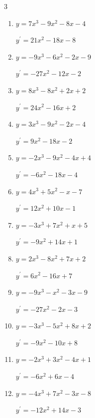 \begin{multicols}{3}
\begin{enumerate}
        $\displaystyle y^{\prime}=18x^{2}+6x+8$

  \item $y=7x^{3}-9x^{2}-8x-4$

        $\displaystyle y^{\prime}=21x^{2}-18x-8$

  \item $y=-9x^{3}-6x^{2}-2x-9$

        $\displaystyle y^{\prime}=-27x^{2}-12x-2$

  \item $y=8x^{3}-8x^{2}+2x+2$

        $\displaystyle y^{\prime}=24x^{2}-16x+2$

  \item $y=3x^{3}-9x^{2}-2x-4$

        $\displaystyle y^{\prime}=9x^{2}-18x-2$

  \item $y=-2x^{3}-9x^{2}-4x+4$

        $\displaystyle y^{\prime}=-6x^{2}-18x-4$

\columnbreak %

\resetques

  \item $y=4x^{3}+5x^{2}-x-7$

        $\displaystyle y^{\prime}=12x^{2}+10x-1$

  \item $y=-3x^{3}+7x^{2}+x+5$

        $\displaystyle y^{\prime}=-9x^{2}+14x+1$

  \item $y=2x^{3}-8x^{2}+7x+2$

        $\displaystyle y^{\prime}=6x^{2}-16x+7$

  \item $y=-9x^{3}-x^{2}-3x-9$

        $\displaystyle y^{\prime}=-27x^{2}-2x-3$

  \item $y=-3x^{3}-5x^{2}+8x+2$

        $\displaystyle y^{\prime}=-9x^{2}-10x+8$

  \item $y=-2x^{3}+3x^{2}-4x+1$

        $\displaystyle y^{\prime}=-6x^{2}+6x-4$

  \item $y=-4x^{3}+7x^{2}-3x-8$

        $\displaystyle y^{\prime}=-12x^{2}+14x-3$


\end{enumerate}
\end{multicols}
